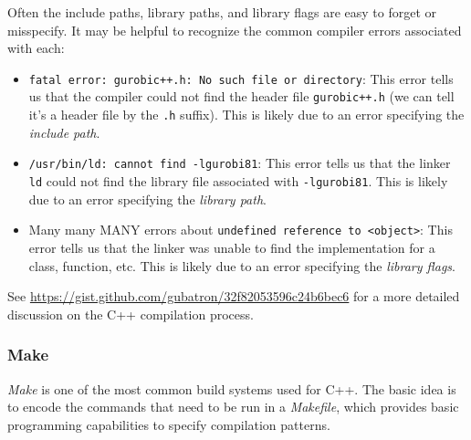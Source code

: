 \documentclass[12pt]{article}
\begin{document}
Often the include paths, library paths, and library flags are easy to forget or misspecify. It may be helpful to recognize the common compiler errors associated with each:
\begin{itemize}
    \item \texttt{fatal error: gurobi\ttul c++.h: No such file or directory}: This error tells us that the compiler could not find the header file \texttt{gurobi\ttul c++.h} (we can tell it's a header file by the \texttt{.h} suffix). This is likely due to an error specifying the \emph{include path}.
    \item \texttt{/usr/bin/ld: cannot find -lgurobi81}: This error tells us that the linker \texttt{ld} could not find the library file associated with \texttt{-lgurobi81}. This is likely due to an error specifying the \emph{library path}.
    \item Many many MANY errors about \texttt{undefined reference to <object>}: This error tells us that the linker was unable to find the implementation for a class, function, etc. This is likely due to an error specifying the \emph{library flags}.
\end{itemize}

See \url{https://gist.github.com/gubatron/32f82053596c24b6bec6} for a more detailed discussion on the C++ compilation process.

\subsubsection{Make}
\emph{Make} is one of the most common build systems used for C++. The basic idea is to encode the commands that need to be run in a \emph{Makefile}, which provides basic programming capabilities to specify compilation patterns.
\end{document}
